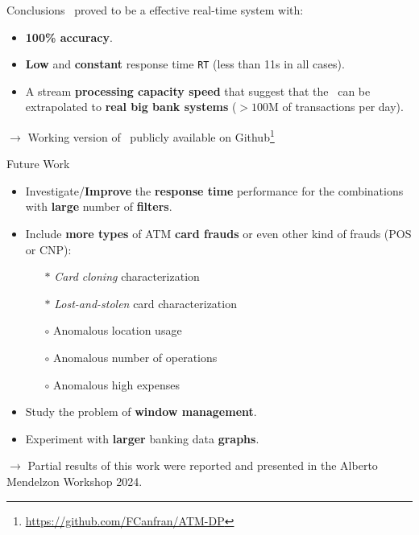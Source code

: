 
\begin{frame}{Conclusions}
\DPATM\ proved to be a effective real-time system with:
\vspace{1em}
\begin{itemize}
    \item \textbf{100\% accuracy}.
    \vspace{1em}
    \item \textbf{Low} and \textbf{constant} response time \texttt{RT} (less than 11s in all cases).
    \vspace{1em}
    \item A stream \textbf{processing capacity speed} that suggest that the \DPATM\ can be extrapolated to \textbf{real big bank systems} ($> 100$M of transactions per day).
\end{itemize}
\vspace{2em}
$\rightarrow$ Working version of \DPATM\ publicly available on Github\footnote{\url{https://github.com/FCanfran/ATM-DP}}

\end{frame}

\begin{frame}{Future Work}
\begin{itemize}
    \item Investigate/\textbf{Improve} the \textbf{response time} performance for the combinations with \textbf{large} number of \textbf{filters}.
    \vspace{0.5em}
    \item Include \textbf{more types} of ATM \textbf{card frauds} or even other kind of frauds (POS or CNP):
    \vspace{0.5em}
        \begin{itemize}
            \item[$\ast$] \emph{Card cloning} characterization
            \item[$\ast$] \emph{Lost-and-stolen} card characterization
            \item[$\circ$] Anomalous location usage
            \item[$\circ$] Anomalous number of operations
            \item[$\circ$] Anomalous high expenses
        \end{itemize}
    \vspace{0.5em}
    \item Study the problem of \textbf{window management}.
    \vspace{0.5em}
    \item Experiment with \textbf{larger} banking data \textbf{graphs}.
\end{itemize}
\vspace{0.3em}
$\rightarrow$ Partial results of this work were reported and presented in the Alberto Mendelzon
Workshop 2024.
\end{frame}


